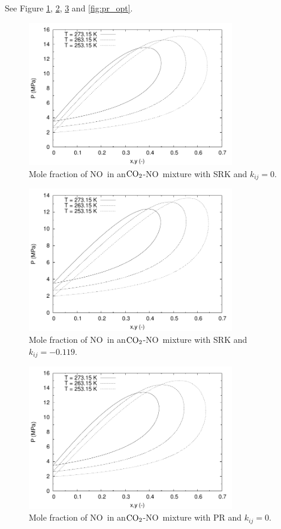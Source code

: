 \documentclass[english]{sintefmemo2012}
\newcommand{\coto}{\ensuremath{\text{CO}_{\text{\scriptsize 2}}}}
\newcommand{\no}{\ensuremath{\text{NO}}}
\begin{document}
See Figure \ref{fig:srk_0}, \ref{fig:srk_opt}, \ref{fig:pr_0} and \ref{fig:pr_opt}.
\begin{figure}[tbp]
  \centering
  \includegraphics[width=0.8\textwidth]{NO_SRK_Txy_k0.pdf}
  \caption{Mole fraction of \no~in an\coto-\no~mixture with SRK and $k_{ij}=0$.}
  \label{fig:srk_0}
\end{figure}

\begin{figure}[tbp]
  \centering
  \includegraphics[width=0.8\textwidth]{NO_SRK_Txy.pdf}
  \caption{Mole fraction of \no~in an\coto-\no~mixture with SRK and $k_{ij}=-0.119$.}
  \label{fig:srk_opt}
\end{figure}

\begin{figure}[tbp]
  \centering
  \includegraphics[width=0.8\textwidth]{NO_PR_Txy_k0.pdf}
  \caption{Mole fraction of \no~in an\coto-\no~mixture with PR and $k_{ij}=0$.}
  \label{fig:pr_0}
\end{figure}
\end{document}
